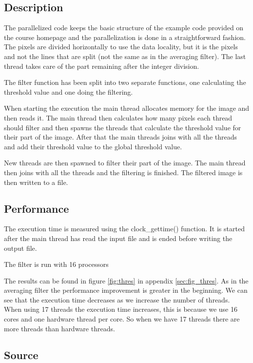 \documentclass[a4paper, 12pt]{article}
\begin{document}
\subsection{Description}
\label{sec:desc2}
The parallelized code keeps the basic structure of the example code provided on
the course homepage and the parallelization is done in a straightforward
fashion. The pixels are divided horizontally to use the data locality, but it is
the pixels and not the lines that are split (not the same as in the averaging
filter). The last thread takes care of the part remaining after the integer
division.

The filter function has been split into two separate functions, one calculating
the threshold value and one doing the filtering.

When starting the execution the main thread allocates memory for the image and
then reads it. The main thread then calculates how many pixels each thread
should filter and then spawns the threads that calculate the threshold value for
their part of the image. After that the main threads joins with all the threads
and add their threshold value to the global threshold value.

New threads are then spawned to filter their part of the image. The main thread
then joins with all the threads and the filtering is finished. The filtered
image is then written to a file.

\subsection{Performance}

The execution time is measured using the clock\_gettime() function. It is
started after the main thread has read the input file and is ended before
writing the output file.

The filter is run with 16 processors


The results can be found in figure \ref{fig:thres} in appendix
\ref{sec:fig_thres}. As in the averaging filter the performance improvement is
greater in the beginning. We can see that the execution time decreases as we
increase the number of threads. When using 17 threads the execution time
increases, this is because we use 16 cores and one hardware thread per core. So
when we have 17 threads there are more threads than hardware threads.

\subsection{Source}
\end{document}

